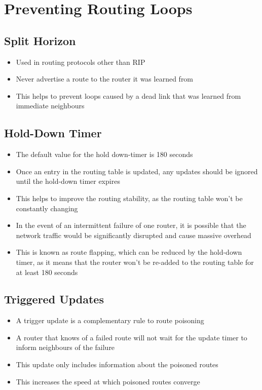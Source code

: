 \section*{Preventing Routing Loops}

\subsection*{Split Horizon}

\begin{itemize}
  \item Used in routing protocols other than RIP
  \item Never advertise a route to the router it was learned from
  \item This helps to prevent loops caused by a dead link that was learned from immediate neighbours
\end{itemize}

\subsection*{Hold-Down Timer}

\begin{itemize}
  \item The default value for the hold down-timer is 180 seconds
  \item Once an entry in the routing table is updated, any updates should be ignored until the hold-down timer expires
  \item This helps to improve the routing stability, as the routing table won't be constantly changing
  \item In the event of an intermittent failure of one router, it is possible that the network traffic would be significantly disrupted and cause massive overhead
  \item This is known as route flapping, which can be reduced by the hold-down timer, as it means that the router won't be re-added to the routing table for at least 180 seconds
\end{itemize}

\subsection*{Triggered Updates}

\begin{itemize}
  \item A trigger update is a complementary rule to route poisoning
  \item A router that knows of a failed route will not wait for the update timer to inform neighbours of the failure
  \item This update only includes information about the poisoned routes
  \item This increases the speed at which poisoned routes converge
\end{itemize}